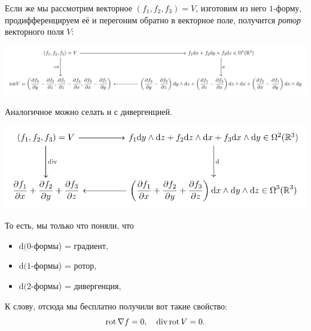 \begin{example}
		Если же мы рассмотрим векторное $(f_1, f_2, f_3) = V$, изготовим из него $1$-форму, продифференцируем её и перегоним обратно в векторное поле, получится \emph{ротор} векторного поля $V$:
		\begin{center}
			\includegraphics[scale = 0.8]{lectures/7/pictures/cd_44.pdf}
		\end{center}


		Аналогичное можно селать и с дивергенцией. 

		\begin{center}
			\includegraphics{lectures/7/pictures/cd_45.pdf}
		\end{center}

		То есть, мы только что поняли, что 
		\begin{itemize}
			\item $\mathrm{d}(0$-формы) = градиент, 
			\item $\mathrm{d}(1$-формы) = ротор,
			\item $\mathrm{d}(2$-формы) = дивергенция,
		\end{itemize}

		К слову, отсюда мы бесплатно получили вот такие свойство: 
		\[
			\operatorname{rot}{\nabla f} = 0, \quad \operatorname{div}{\operatorname{rot}{V}} = 0.
		\]
	\end{example}



	






	


